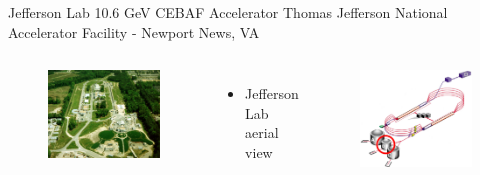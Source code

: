 \documentclass[aspectratio=169]{beamer}
\newcommand*{\myfont}{\fontfamily{lmtt}\selectfont}
\begin{document}
\begin{frame}{Jefferson Lab 10.6 GeV CEBAF Accelerator} \label{frame:datasets1}
        Thomas Jefferson National Accelerator Facility - Newport News, VA
        
        \begin{columns}[t, onlytextwidth]
                \begin{figure}[t!]
                    \includegraphics[width=.76349\textwidth]{Introduction/jlab.jpg}
                    
                    
                \end{figure}
                \vspace{-0.45cm}
            \begin{itemize}
                    \setlength\itemsep{1em}
                    \item Jefferson Lab aerial view
                    {\myfont{\tiny [jlab.org] }}
                    \end{itemize}
                    
                \begin{figure}[t!]
                    \includegraphics[width=.56765899\textwidth]{DNP/jlab_hall_b_circled.jpg}
                    

\end{figure}
\end{columns}
\end{frame}
\end{document}
